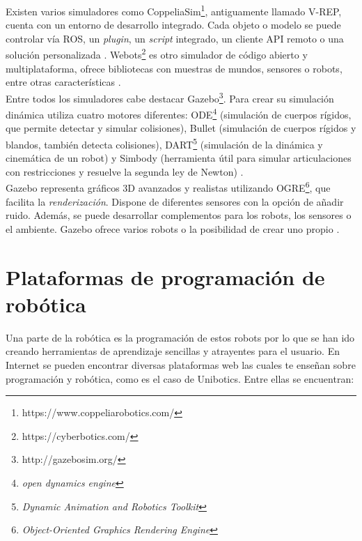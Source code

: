 Existen varios simuladores como CoppeliaSim\footnote{https://www.coppeliarobotics.com/}, antiguamente llamado V-REP, cuenta con un entorno de desarrollo integrado. Cada objeto o modelo se puede controlar vía ROS, un \textit{plugin}, un \textit{script} integrado, un cliente API remoto o una solución personalizada \cite{sim}.  Webots\footnote{https://cyberbotics.com/} es otro simulador de código abierto y multiplataforma, ofrece bibliotecas con muestras de mundos, sensores o robots, entre otras características \cite{körber2021comparing}.\\

Entre todos los simuladores cabe destacar Gazebo\footnote{http://gazebosim.org/}. Para crear su simulación dinámica utiliza cuatro motores diferentes: ODE\footnote{\textit{open dynamics engine}} (simulación de cuerpos rígidos, que permite detectar y simular colisiones), Bullet (simulación de cuerpos rígidos y blandos, también detecta colisiones), DART\footnote{\textit{Dynamic Animation and Robotics Toolkit}} (simulación de la dinámica y cinemática de un robot) y Simbody (herramienta útil para simular articulaciones con restricciones y resuelve la segunda ley de Newton) \cite{upm56724}.\\

Gazebo representa gráficos 3D avanzados y realistas utilizando OGRE\footnote{\textit{Object-Oriented Graphics Rendering Engine}}, que facilita la \textit{renderización}. Dispone de diferentes sensores con la opción de añadir ruido. Además, se puede desarrollar complementos para los robots, los sensores o el ambiente. Gazebo ofrece varios robots o la posibilidad de crear uno propio \cite{gaz}.
\newpage
\section{Plataformas de programación de robótica}
Una parte de la robótica es la programación de estos robots por lo que se han ido creando herramientas de aprendizaje sencillas y atrayentes para el usuario. En Internet se pueden encontrar diversas plataformas web las cuales te enseñan sobre programación y robótica, como es el caso de Unibotics. Entre ellas se encuentran:

